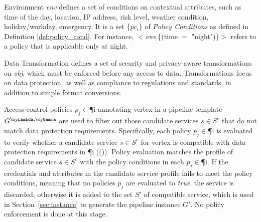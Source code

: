 \begin{definition}[Policy]
\begin{description}
          \item Environment \textit{env} defines a set of conditions on contextual attributes, such as time of the day, location, IP address, risk level, weather condition, holiday/workday, emergency. It is a set \{$pc_i$\} of \emph{Policy Conditions} as defined in Definition \ref{def:policy_cond}. For instance, $<$\emph{env},\{(time $=$ "night")\}$>$ refers to a policy that is applicable only at night.

          \item Data Transformation \textit{\TP} defines a set of security and privacy-aware transformations on \textit{obj}, which must be enforced before any access to data. Transformations focus on data protection, as well as compliance to regulations and standards, in addition to simple format conversions.
        \end{description}
      \end{definition}

      Access control policies $p_j$$\in$\P{i} annotating vertex  in a pipeline template $G^{\myLambda,\myGamma}$ are used to filter out those candidate services $s$$\in$$S^c$ that do not match data protection requirements. Specifically, each policy $p_j$$\in$\P{i} is evaluated to verify whether a candidate service $s$$\in$$S^c$ for vertex  is compatible with data protection requirements in \P{i} (\myLambda()). Policy evaluation matches the profile of candidate service $s$$\in$$S^c$ with the policy conditions in each $p_j$$\in$\P{i}. If the credentials and attributes in the candidate service profile fails to meet the policy conditions, meaning that no policies $p_j$ are evaluated to \emph{true}, the service is discarded; otherwise it is added to the set $S'$ of compatible service, which is used in Section~\ref{sec:instance} to generate the pipeline instance $G'$. No policy enforcement is done at this stage.

